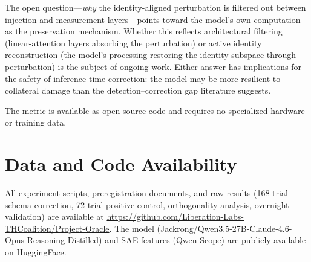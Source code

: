 \documentclass[11pt,a4paper]{article}
\begin{document}
The open question---\emph{why} the identity-aligned perturbation is
filtered out between injection and measurement layers---points toward
the model's own computation as the preservation mechanism. Whether this
reflects architectural filtering (linear-attention layers absorbing the
perturbation) or active identity reconstruction (the model's processing
restoring the identity subspace through perturbation) is the subject of
ongoing work. Either answer has implications for the safety of
inference-time correction: the model may be more resilient to collateral
damage than the detection--correction gap literature suggests.

The metric is available as open-source code and requires no specialized
hardware or training data.

\section*{Data and Code Availability}

All experiment scripts, preregistration documents, and raw results
(168-trial schema correction, 72-trial positive control, orthogonality
analysis, overnight validation) are available at
\url{https://github.com/Liberation-Labs-THCoalition/Project-Oracle}.
The model (Jackrong/Qwen3.5-27B-Claude-4.6-Opus-Reasoning-Distilled) and
SAE features (Qwen-Scope) are publicly available on HuggingFace.



\end{document}
